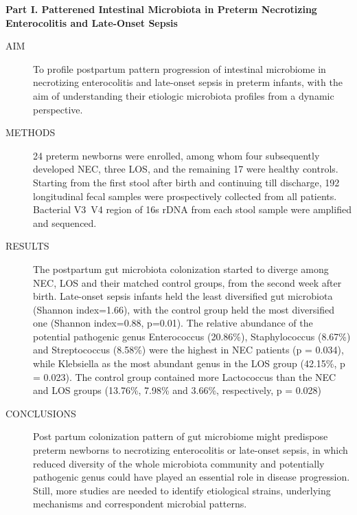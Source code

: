 \begin{englishabstract}
  \textbf{Part I. Patterened Intestinal Microbiota in Preterm Necrotizing Enterocolitis and Late-Onset Sepsis}
    \begin{description}
      \item[AIM] To profile postpartum pattern progression of intestinal microbiome in necrotizing enterocolitis and late-onset sepsis in preterm infants, with the aim of understanding their etiologic microbiota profiles from a dynamic perspective.
      \item[METHODS] 24 preterm newborns were enrolled, among whom four subsequently developed NEC, three LOS, and the remaining 17 were healthy controls. Starting from the first stool after birth and continuing till discharge, 192 longitudinal fecal samples were prospectively collected from all patients. Bacterial V3~V4 region of 16s rDNA from each stool sample were amplified and sequenced.
      \item[RESULTS] The postpartum gut microbiota colonization started to diverge among NEC, LOS and their matched control groups, from the second week after birth.  Late-onset sepsis infants held the least diversified gut microbiota (Shannon index=1.66), with the control group held the most diversified one (Shannon index=0.88, p=0.01). The relative abundance of the potential pathogenic genus Enterococcus (20.86\%), Staphylococcus (8.67\%) and Streptococcus (8.58\%) were the highest in NEC patients (p = 0.034), while Klebsiella as the most abundant genus in the LOS group (42.15\%, p = 0.023). The control group contained more Lactococcus than the NEC and LOS groups (13.76\%, 7.98\% and 3.66\%, respectively, p = 0.028)
      \item[CONCLUSIONS] Post partum colonization pattern of gut microbiome might predispose preterm newborns to necrotizing enterocolitis or late-onset sepsis, in which reduced diversity of the whole microbiota community and potentially pathogenic genus could have played an essential role in disease progression. Still, more studies are needed to identify etiological strains, underlying mechanisms and correspondent microbial patterns.
    \end{description}


\end{englishabstract}
